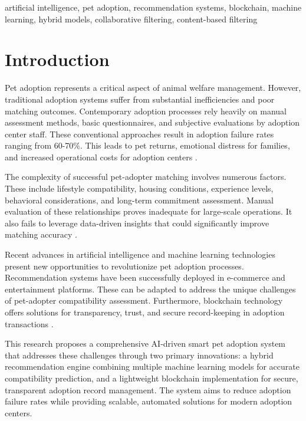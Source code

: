 \documentclass[conference]{IEEEtran}
\begin{document}
\begin{IEEEkeywords}
artificial intelligence, pet adoption, recommendation systems, blockchain, machine learning, hybrid models, collaborative filtering, content-based filtering
\end{IEEEkeywords}

\section{Introduction}

Pet adoption represents a critical aspect of animal welfare management. However, traditional adoption systems suffer from substantial inefficiencies and poor matching outcomes. Contemporary adoption processes rely heavily on manual assessment methods, basic questionnaires, and subjective evaluations by adoption center staff. These conventional approaches result in adoption failure rates ranging from 60-70\%. This leads to pet returns, emotional distress for families, and increased operational costs for adoption centers \cite{petadoption2023}.

The complexity of successful pet-adopter matching involves numerous factors. These include lifestyle compatibility, housing conditions, experience levels, behavioral considerations, and long-term commitment assessment. Manual evaluation of these relationships proves inadequate for large-scale operations. It also fails to leverage data-driven insights that could significantly improve matching accuracy \cite{animalwelfare2023}.

Recent advances in artificial intelligence and machine learning technologies present new opportunities to revolutionize pet adoption processes. Recommendation systems have been successfully deployed in e-commerce and entertainment platforms. These can be adapted to address the unique challenges of pet-adopter compatibility assessment. Furthermore, blockchain technology offers solutions for transparency, trust, and secure record-keeping in adoption transactions \cite{aiapplications2024}.

This research proposes a comprehensive AI-driven smart pet adoption system that addresses these challenges through two primary innovations: a hybrid recommendation engine combining multiple machine learning models for accurate compatibility prediction, and a lightweight blockchain implementation for secure, transparent adoption record management. The system aims to reduce adoption failure rates while providing scalable, automated solutions for modern adoption centers.
\end{document}
